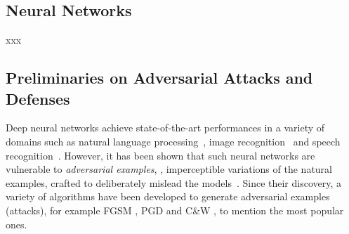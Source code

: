 %
%









\subsection{Neural Networks}
\label{subsection:ch2-neural_networks}
xxx


\subsection{Preliminaries on Adversarial Attacks and Defenses}
\label{section:ch2-preliminaries_adversarial_attacks_and_defenses}

Deep neural networks achieve state-of-the-art performances in a variety of domains such as natural language processing~\cite{radford2018Language}, image recognition~\cite{he2016deep} and speech recognition~\cite{hinton2012deep}.
However, it has been shown that such neural networks are vulnerable to \emph{adversarial examples}, \ie, imperceptible variations of the natural examples, crafted to deliberately mislead the models~\cite{globerson2006nightmare,biggio2013evasion,szegedy2013intriguing}.
Since their discovery, a variety of algorithms have been developed to generate adversarial examples (\aka attacks), for example FGSM \cite{goodfellow2014explaining}, PGD \cite{madry2018towards} and C\&W \cite{carlini2017towards}, to mention the most popular ones.

